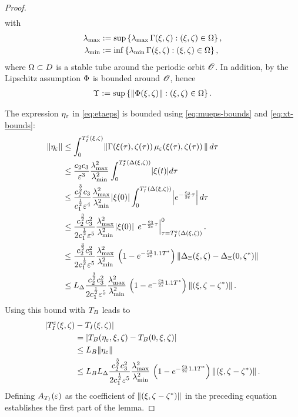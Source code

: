 \begin{proof}
\begin{align}
  \end{align}
  with
  \begin{align*}
    \lambda_{\mathrm{max}} &:= \sup \left\{\operatorname*{\lambda_{\mathrm{max}}}\Gamma(\xi, \zeta) : (\xi, \zeta) \in \Omega
    \right\},\\
    \lambda_{\mathrm{min}} &:= \inf \left\{\operatorname*{\lambda_{\mathrm{min}}}\Gamma(\xi, \zeta) : (\xi, \zeta) \in \Omega
    \right\},
  \end{align*}
  where $\Omega \subset D$ is a stable tube around the periodic orbit
  ${\mathscr O}$.
  In addition, by the Lipschitz assumption $\Phi$ is bounded around ${\mathscr O}$,
  hence
  \begin{align*}
    \Upsilon := \sup \left\{ \left\| \Phi(\xi, \zeta) \right\| : (\xi, \zeta) \in
      \Omega \right\}.
  \end{align*}

  The expression $\eta_{\varepsilon}$ in \eqref{eq:etaeps} is bounded using
  \eqref{eq:mueps-bounds} and \eqref{eq:xt-bounds}:
  \begin{align}
    \nonumber
    \|\eta_{\varepsilon}\| &\leq \int_{0}^{T_{I}^{\varepsilon}(\xi, \zeta)} \! \left\| \Gamma(\xi(\tau), \zeta(\tau)) \,
      \mu_{\varepsilon}(\xi(\tau), \zeta(\tau)) \, \right\| d\tau\\
    \nonumber
    &\leq \frac{c_{2}c_{3}}{\varepsilon^{3}}
    \frac{\lambda_{\mathrm{max}}^{2}}{\lambda_{\mathrm{min}}^{2}} \int_{0}^{T_{I}^{\varepsilon}(\Delta(\xi, \zeta))} \! |\xi(t)|
    d\tau\\
    \nonumber
    &\leq \frac{c_{2}^{\frac{3}{2}}c_{3}}{c_{1}^{\frac{1}{2}}\varepsilon^{4}}
    \frac{\lambda_{\mathrm{max}}^{2}}{\lambda_{\mathrm{min}}^{2}} |\xi(0)| \int_{0}^{T_{I}^{\varepsilon}(\Delta(\xi, \zeta))} \!
    \left|e^{-\frac{c_{3}}{2\varepsilon} \tau} \right| d\tau\\
    \nonumber
    &\leq \frac{c_{2}^{\frac{3}{2}}
      c_{3}^{2}}{2c_{1}^{\frac{1}{2}}\varepsilon^{5}}
    \frac{\lambda_{\mathrm{max}}^{2}}{\lambda_{\mathrm{min}}^{2}} |\xi(0)| \,
    \left. e^{-\frac{c_{3}}{2\varepsilon} \tau} \right|^{0}_{\tau=T_{I}^{\varepsilon}(\Delta(\xi, \zeta))}.\\
    \nonumber
    &\leq\frac{c_{2}^{\frac{3}{2}}
      c_{3}^{2}}{2c_{1}^{\frac{1}{2}}\varepsilon^{5}}
    \frac{\lambda_{\mathrm{max}}^{2}}{\lambda_{\mathrm{min}}^{2}}  \, \left(1 -
      e^{-\frac{c_{3}}{2\varepsilon} 1.1 T^{*}}\right) \left\|\Delta_{\Xi}(\xi, \zeta) -
      \Delta_{\Xi}(0, \zeta^{*})\right\|\\
    \label{eq:G-bound}
    &\leq L_{\Delta} \frac{c_{2}^{\frac{3}{2}}
      c_{3}^{2}}{2c_{1}^{\frac{1}{2}}\varepsilon^{5}}
    \frac{\lambda_{\mathrm{max}}^{2}}{\lambda_{\mathrm{min}}^{2}}  \, \left(1 -
      e^{-\frac{c_{3}}{2\varepsilon} 1.1 T^{*}}\right) \left\|(\xi, \zeta - \zeta^{*})\right\|.
  \end{align}
  Using this bound with $T_{B}$ leads to
  \begin{align*}
    | T_{I}^{\varepsilon}(\xi, \zeta) &- T_{I}(\xi, \zeta) |\\
    &= | T_{B}(\eta_{\varepsilon}, \xi, \zeta) - T_{B}(0, \xi, \zeta)|\\
    &\leq L_{B} \| \eta_{\varepsilon} \|\\
    &\leq L_{B} L_{\Delta} \frac{c_{2}^{\frac{3}{2}}
      c_{3}^{2}}{2c_{1}^{\frac{1}{2}}\varepsilon^{5}}
    \frac{\lambda_{\mathrm{max}}^{2}}{\lambda_{\mathrm{min}}^{2}}  \, \left(1 -
      e^{-\frac{c_{3}}{2\varepsilon} 1.1 T^{*}}\right) \left\|(\xi, \zeta - \zeta^{*})\right\|.
  \end{align*}
  Defining $A_{T_{I}}(\varepsilon)$ as the coefficient of $\left\|(\xi, \zeta - \zeta^{*})\right\|$ in the preceding equation
  establishes the first part of the lemma.


\end{proof}
